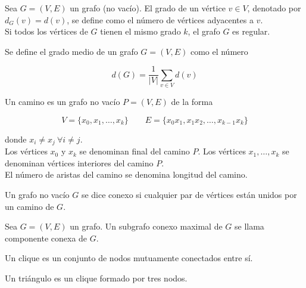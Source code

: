 \begin{defi}
	Sea $G = (V,E)$ un grafo (no vacío). El grado de un vértice $v \in V$, denotado por $d_G(v) = d(v)$, se define como el número de vértices adyacentes a $v$.\\
	
	Si todos los vértices de $G$ tienen el mismo grado $k$, el grafo $G$ es regular.
\end{defi}

\begin{defi}
	Se define el grado medio de un grafo $G = (V,E)$ como el número
	
	\begin{equation}
	d(G) = \dfrac{1}{|V|} \sum_{v \in V} d(v)
	\end{equation}
\end{defi}

\begin{defi}
	Un camino es un grafo no vacío $P = (V, E)$ de la forma
	
	\begin{equation*}
	V = \{ x_0,x_1,\dots,x_k\} \quad \quad E = \{ x_0 x_1, x_1 x_2, \dots, x_{k-1}x_k \}
	\end{equation*}
	
	donde $x_i \neq x_j \ \forall i \neq j$.\\
	
	Los vértices $x_0$ y $x_k$ se denominan final del camino $P$. Los vértices $x_1, \dots, x_k$ se denominan vértices interiores del camino $P$.\\
	
	El número de aristas del camino se denomina longitud del camino.
\end{defi}

\begin{defi}
	Un grafo no vacío $G$ se dice conexo si cualquier par de vértices están unidos por un camino de $G$.
\end{defi}

\begin{defi}
	Sea $G = (V,E)$ un grafo. Un subgrafo conexo maximal de $G$ se llama componente conexa de $G$.
\end{defi}

\begin{defi}
	Un clique es un conjunto de nodos mutuamente conectados entre sí.
\end{defi}

\begin{ejemplo}
	Un triángulo es un clique formado por tres nodos.
\end{ejemplo}

